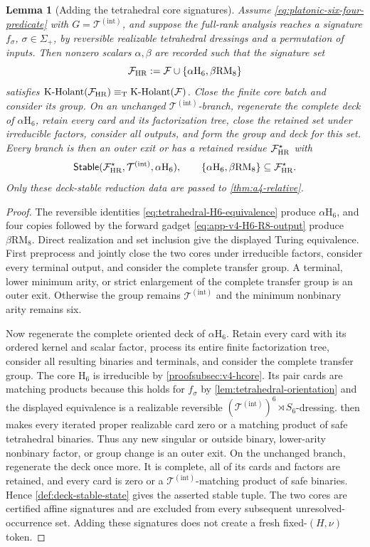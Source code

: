 \documentclass[11pt,letterpaper,onecolumn]{article}
\theoremstyle{plain}
\newtheorem{lemma}[lemma]{Lemma}
\theoremstyle{definition}
\theoremstyle{remark}
\newcommand{\cF}{\mathcal F}
\newcommand{\KHolant}{\operatorname{K\text{-}Holant}}
\newcommand{\TetInt}{{\mathcal T^{(\mathrm{int})}}}
\newcommand{\Stable}{\mathsf{Stable}}
\newcommand{\RMcore}{\mathrm{RM}_8}
\newcommand{\Hcore}{\mathrm{H}_6}
\newcommand{\equivT}{\equiv_{\mathrm T}}
\begin{document}
\begin{lemma}[Adding the tetrahedral core signatures]
\label{lem:tetrahedral-stable-HR-augmentation}
Assume \cref{eq:platonic-six-four-predicate} with \(G=\TetInt\), and suppose the full-rank
analysis reaches a signature \(f_\sigma\), \(\sigma\in\Sigma_+\), by reversible realizable tetrahedral dressings and a permutation of inputs.  Then nonzero scalars \(\alpha,\beta\) are recorded such
that the signature set
\[
 \cF_{\rm HR}:=
 \cF\cup\{\alpha\Hcore,\beta\RMcore\}
\]
satisfies \(\KHolant(\cF_{\rm HR})\equivT\KHolant(\cF)\).  Close
the finite core batch and consider its group.  On an unchanged
\(\TetInt\)-branch, regenerate the complete deck of
\(\alpha\Hcore\), retain every card and its factorization tree, close the retained set under irreducible factors, consider all outputs, and form the group and deck for this set.
Every branch is then an outer exit or has a retained residue
\(\cF_{\rm HR}^\star\) with
\[
 \Stable(\cF_{\rm HR}^\star,\TetInt,\alpha\Hcore),
 \qquad
 \{\alpha\Hcore,\beta\RMcore\}\subseteq\cF_{\rm HR}^\star.
\]
Only these deck-stable reduction data are passed to \cref{thm:a4-relative}.
\end{lemma}

\begin{proof}
The reversible identities \cref{eq:tetrahedral-H6-equivalence} produce
\(\alpha\Hcore\), and four copies followed by the forward gadget
\cref{eq:app-v4-H6-R8-output} produce \(\beta\RMcore\).  Direct realization
and set inclusion give the displayed Turing equivalence.  First
preprocess and jointly close the two cores under irreducible factors, consider every
terminal output, and consider the complete transfer group.  A terminal, lower
minimum arity, or strict enlargement of the complete transfer group is an outer exit.
Otherwise the group remains \(\TetInt\) and the minimum nonbinary arity
remains six.

Now regenerate the complete oriented deck of \(\alpha\Hcore\).
Retain every card with its ordered kernel and scalar factor, process
its entire finite factorization tree, consider all resulting binaries and
terminals, and consider the complete transfer group.  The core \(\Hcore\) is
irreducible by \cref{proofsubsec:v4-hcore}. Its pair cards are matching
products because this holds for \(f_\sigma\) by
\cref{lem:tetrahedral-orientation} and the displayed equivalence is a realizable reversible \((\TetInt)^6\rtimes S_6\)-dressing.
 then makes every iterated
proper realizable card zero or a matching product of safe tetrahedral binaries.  Thus
any new singular or outside binary, lower-arity nonbinary factor, or group
change is an outer exit.  On the unchanged branch, regenerate the deck
once more.  It is complete, all of its cards and factors are retained, and
every card is zero or a \(\TetInt\)-matching product of safe binaries. Hence
\cref{def:deck-stable-state} gives the asserted stable tuple.  The two
cores are certified affine signatures and are excluded from every subsequent
unresolved-occurrence set. Adding these signatures does not create a fresh
fixed-\((H,\nu)\) token.
\end{proof}
\end{document}
